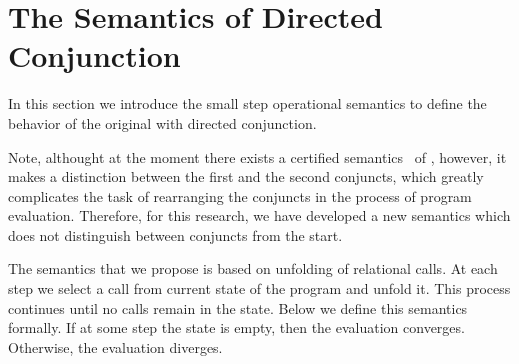 \section{The Semantics of Directed Conjunction}
In this section we introduce the small step operational semantics to define the behavior of the original \mk with directed conjunction. 


Note, althought at the moment there exists a certified semantics~\cite{fair:semantics} of \mk, however, it makes a distinction between the first
and the second conjuncts, which greatly complicates the task of rearranging the conjuncts in the process of program evaluation. 
Therefore, for this research, we have developed a new semantics which does not distinguish between conjuncts from the start.


The semantics that we propose is based on unfolding of relational calls. At each step we select a call from current state of the program and unfold it.
This process continues until no calls remain in the state. Below we define this semantics formally. If at some step the state is empty, then the evaluation converges. Otherwise, the evaluation diverges.


